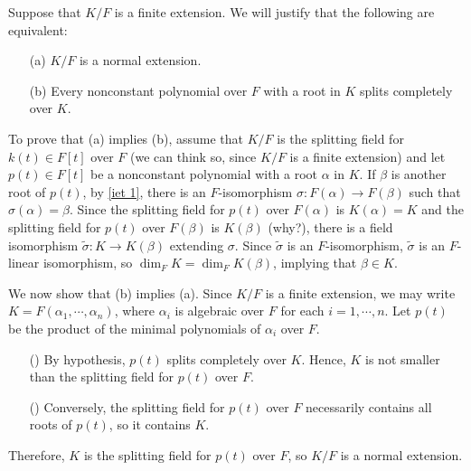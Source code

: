 \begin{exmp}
    Suppose that $K/F$ is a finite extension.
    We will justify that the following are equivalent:
    \begin{enumerate}
        \item[(a)]
        {
            $K/F$ is a normal extension.
        }
        \item[(b)]
        {
            Every nonconstant polynomial over $F$ with a root in $K$ splits completely over $K$.
        }
    \end{enumerate}

    To prove that (a) implies (b), assume that $K/F$ is the splitting field for $k(t)\in F[t]$ over $F$ (we can think so, since $K/F$ is a finite extension) and let $p(t)\in F[t]$ be a nonconstant polynomial with a root $\alpha$ in $K$.
    If $\beta$ is another root of $p(t)$, by \cref{iet 1}, there is an $F$-isomorphism $\sigma: F(\alpha)\rightarrow F(\beta)$ such that $\sigma(\alpha)=\beta$.
    Since the splitting field for $p(t)$ over $F(\alpha)$ is $K(\alpha)=K$ and the splitting field for $p(t)$ over $F(\beta)$ is $K(\beta)$ \color{brown}(why?)\color{black}, there is a field isomorphism $\widetilde{\sigma}: K\rightarrow K(\beta)$ extending $\sigma$.
    Since $\widetilde{\sigma}$ is an $F$-isomorphism, $\widetilde{\sigma}$ is an $F$-linear isomorphism, so $\dim_F K=\dim_F K(\beta)$, implying that $\beta\in K$.

    We now show that (b) implies (a).
    Since $K/F$ is a finite extension, we may write $K=F(\alpha_1, \cdots, \alpha_n)$, where $\alpha_i$ is algebraic over $F$ for each $i=1, \cdots, n$.
    Let $p(t)$ be the product of the minimal polynomials of $\alpha_i$ over $F$.
    \begin{enumerate}
        \item[(\romannumeral 1)]
        {
            By hypothesis, $p(t)$ splits completely over $K$.
            Hence, $K$ is not smaller than the splitting field for $p(t)$ over $F$.
        }
        \item[(\romannumeral 2)]
        {
            Conversely, the splitting field for $p(t)$ over $F$ necessarily contains all roots of $p(t)$, so it contains $K$.
        }
    \end{enumerate}
    Therefore, $K$ is the splitting field for $p(t)$ over $F$, so $K/F$ is a normal extension.
\end{exmp}
